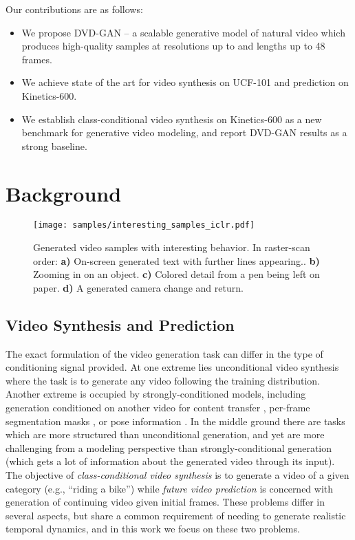 \documentclass{article} \usepackage{iclr2020_conference,times}
\begin{document}
Our contributions are as follows:
\begin{itemize}
\item We propose DVD-GAN -- a scalable generative model of natural video which produces high-quality samples at resolutions up to  and lengths up to 48 frames.

\item We achieve state of the art for video synthesis on UCF-101 and prediction on Kinetics-600.

\item We establish class-conditional video synthesis on Kinetics-600 as a new benchmark for generative video modeling, and report DVD-GAN results as a strong baseline.

\end{itemize}

\section{Background}

\begin{figure}[t]
\centering
\texttt{[image: samples/interesting\_samples\_iclr.pdf]}

\caption{Generated video samples with interesting behavior. In raster-scan order:
\textbf{a)} On-screen generated text with further lines appearing..
\textbf{b)} Zooming in on an object. \textbf{c)} Colored detail from a pen being left on paper. \textbf{d)} A generated camera change and return.}
\label{fig:interesting}
\end{figure}

\subsection{Video Synthesis and Prediction}
\label{ss:synth}
The exact formulation of the video generation task can differ in the type of conditioning signal provided. 
At one extreme lies unconditional video synthesis where the task is to generate any video following the training distribution. 
Another extreme is occupied by strongly-conditioned models, including generation conditioned on another video for content transfer \citep{Bansal_2018_ECCV, zhou2019dance}, per-frame segmentation masks \citep{DBLP:journals/corr/abs-1808-06601}, or pose information \citep{pos_iccv2017, villegas2017learning, yang2018pose}.
In the middle ground there are tasks
which are more structured than unconditional generation, and yet are more challenging from a modeling perspective than strongly-conditional generation (which gets a lot of information about the generated video through its input). 
The objective of \textit{class-conditional video synthesis} is to generate a video of a given category (e.g., ``riding a bike'') while \textit{future video prediction} is concerned with generation of continuing video given initial frames. These problems differ in several aspects, but share a common requirement of needing to generate realistic temporal dynamics, and in this work we focus on these two problems.
\end{document}
